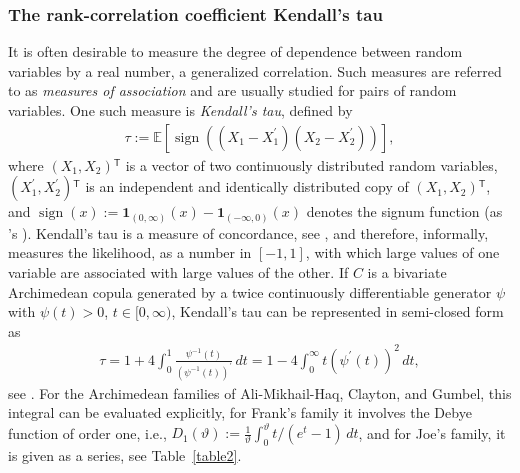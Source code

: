 \documentclass[nojss,article]{jss}
\theoremstyle{mythmstyle}
\newcommand*{\R}{\proglang{R}}%
\newcommand*{\I}{\mathbf{1}}
\newcommand*{\IE}{\mathbb{E}}
\newcommand*{\sign}{\operatorname*{sign}}
\newcommand*{\vt}{\vartheta}
\newcommand*{\psiD}{\psi^\prime}
\newcommand*{\psii}{{\psi^{-1}}}
\newcommand{\tr}{\ensuremath{^\mathsf{T}}}%
\newcommand*{\textcite}[2][]{\citet[#1]{#2}}
\begin{document}
\subsubsection{The rank-correlation coefficient Kendall's tau}
It is often desirable to measure the degree of dependence between random
variables by a real number, a generalized correlation. Such measures are
referred to as \textit{measures of association} and are usually studied for
pairs of random variables. One such measure is \textit{Kendall's tau}, defined by
\begin{align*}
  \tau:=\IE[\sign((X_1-X_1^\prime)(X_2-X_2^\prime))],
\end{align*}
where $(X_1,X_2)\tr$ is a vector of two continuously distributed random
variables, $(X_1^\prime,X_2^\prime)\tr$ is an independent and identically
distributed copy of $(X_1,X_2)\tr$, and
$\sign(x):=\I_{(0,\infty)}(x)-\I_{(-\infty,0)}(x)$ denotes the signum function
(as \R's ). Kendall's tau is a measure of concordance, see
\textcite{scarsini1984}, and therefore,
informally, measures the likelihood, as a number in $[-1,1]$, with which
large values of one variable are associated with large values of the other.
If $C$ is a bivariate Archimedean copula generated by a twice continuously
differentiable generator $\psi$ with $\psi(t)>0$, $t\in[0,\infty)$,
Kendall's tau can be represented in semi-closed form as
\begin{align*}
  \tau= 1 + 4\int_0^1\frac{\psii(t)}{(\psii(t))^\prime}\,dt =
        1 - 4\int_0^\infty t(\psiD(t))^2\,dt,
\end{align*}
see \textcite[p.\ 91]{joe1997}. For the Archimedean families of
Ali-Mikhail-Haq, Clayton, and Gumbel, this integral can be evaluated
explicitly, for Frank's family it involves the Debye function of order one,
i.e., $D_1(\vt):=\frac 1 \vt \int_0^\vt t/(e^t-1)\,dt$, and for Joe's family, it
is given as a series, see Table~\ref{table2}.
\end{document}
